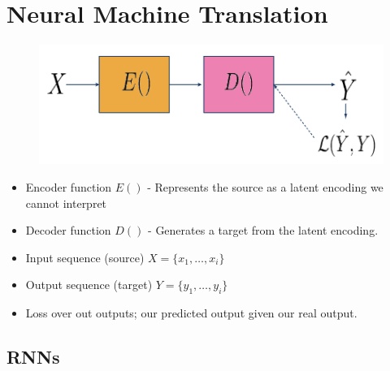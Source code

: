 \documentclass[11pt]{article}
\begin{document}
\section{Neural Machine Translation}

\begin{figure}[H]
    \centering
    \includegraphics[width=.5\linewidth]{figures/encoder-decoder.png}
\end{figure}

\begin{itemize}
    \item Encoder function $E()$ - Represents the source as a latent encoding we cannot interpret
    \item Decoder function $D()$ - Generates a target from the latent encoding.
    \item Input sequence (source) $X=\{x_1,\dots, x_i\}$
    \item Output sequence (target) $Y=\{y_1,\dots, y_i\}$
    \item Loss over out outputs; our predicted output given our real output.
\end{itemize}

\subsection{RNNs}

\begin{figure}[H]
    \centering
\end{figure}
\end{document}
